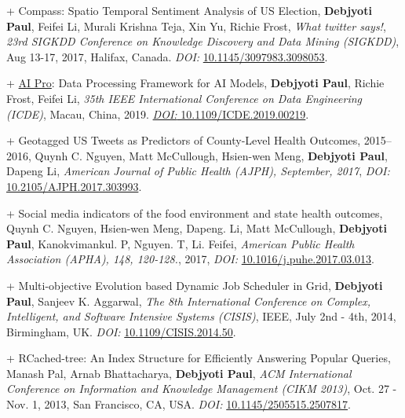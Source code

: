 \documentclass[8pt]{article}
\makeatletter
\newlength{\bibhang}
\newlength{\bibsep}
 {\@listi \global\bibsep\itemsep \global\advance\bibsep by\parsep}
\newenvironment{bibsection}%
        {\vspace{-\baselineskip}\begin{list}{}{%
       \setlength{\leftmargin}{\bibhang}%
       \setlength{\itemindent}{-\leftmargin}%
       \setlength{\itemsep}{\bibsep}%
       \setlength{\parsep}{\z@}%
        \setlength{\partopsep}{0pt}%
        \setlength{\topsep}{0pt}}}
        {\end{list}\vspace{-.6\baselineskip}}
\makeatother
\begin{document}
\begin{bibsection}
\item[+] Compass: Spatio Temporal Sentiment Analysis of US Election, \textbf{Debjyoti Paul}, Feifei Li, Murali Krishna Teja, Xin Yu, Richie Frost,  \textit{What twitter says!}, \emph{23rd SIGKDD Conference on Knowledge Discovery and Data Mining (SIGKDD)}, Aug 13-17, 2017, Halifax, Canada. \textit{DOI:} \href{https://dx.doi.org/10.1145/3097983.3098053}{10.1145/3097983.3098053}.
\item[+] \href{https://www.cs.utah.edu/~deb/aipro/}{AI Pro}: Data Processing Framework for AI Models, \textbf{Debjyoti Paul}, Richie Frost, Feifei Li, \emph{35th IEEE International Conference on Data Engineering (ICDE)}, Macau, China, 2019. \href{https://doi.org/10.1109/ICDE.2019.00219}{\textit{DOI:} 10.1109/ICDE.2019.00219}.
\item[+] Geotagged US Tweets as Predictors of County-Level Health Outcomes, 2015–2016, Quynh C. Nguyen, Matt McCullough, Hsien-wen Meng, \textbf{Debjyoti Paul}, Dapeng Li,  \emph{American Journal of Public Health (AJPH), September, 2017}, \textit{DOI:} \href{https://dx.doi.org/10.2105/AJPH.2017.303993}{10.2105/AJPH.2017.303993}.
\item[+] Social media indicators of the food environment and state health outcomes, Quynh C. Nguyen, Hsien-wen Meng, Dapeng. Li, Matt McCullough, \textbf{Debjyoti Paul}, Kanokvimankul. P, Nguyen. T, Li. Feifei, \emph{ American Public Health Association (APHA), 148, 120-128.}, 2017, \textit{DOI:} \href{https://dx.doi.org/10.1016/j.puhe.2017.03.013}{10.1016/j.puhe.2017.03.013}.
\item[+] Multi-objective Evolution based Dynamic Job Scheduler in Grid, \textbf{Debjyoti Paul}, Sanjeev K. Aggarwal,  \emph{The 8th International Conference on Complex, Intelligent, and Software Intensive Systems (CISIS)}, IEEE, July 2nd - 4th, 2014, Birmingham, UK. \textit{DOI:} \href{https://dx.doi.org/10.1109/CISIS.2014.50}{10.1109/CISIS.2014.50}.
\item[+] RCached-tree: An Index Structure for Efficiently Answering Popular Queries, Manash Pal, Arnab Bhattacharya, \textbf{Debjyoti Paul}, \emph{ACM International Conference on Information and Knowledge Management (CIKM 2013)}, Oct. 27 - Nov. 1, 2013, San Francisco, CA, USA. \textit{DOI:}  \href{https://dx.doi.org/10.1145/2505515.2507817}{10.1145/2505515.2507817}.
\end{bibsection}
\end{document}
